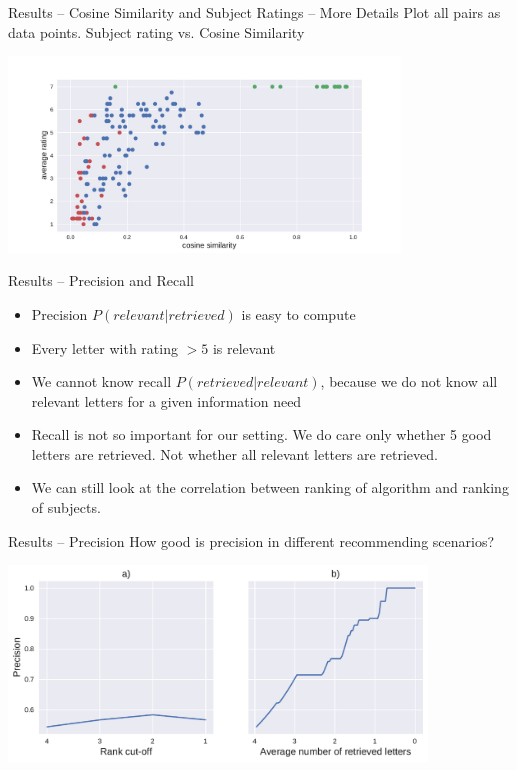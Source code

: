 \documentclass[10pt]{beamer}
\begin{document}
\begin{frame}{Results -- Cosine Similarity and Subject Ratings -- More Details}
	Plot all pairs as data points. Subject rating vs. Cosine Similarity
	\begin{center}
		\includegraphics[height=5.2cm]{rating_vs_similarity}
	\end{center}
\end{frame}


\begin{frame}{Results -- Precision and Recall}
	\begin{itemize}
		\item Precision $P(relevant|retrieved)$ is easy to compute
		\item Every letter with rating $>5$ is relevant
		\item We cannot know recall $P(retrieved|relevant)$, because we do not know all relevant letters for a given information need
		\item Recall is not so important for our setting. We do care only whether 5 good letters are retrieved. Not whether all relevant letters are retrieved.
		\item We can still look at the correlation between ranking of algorithm and ranking of subjects. 
	\end{itemize}
\end{frame}


\begin{frame}{Results -- Precision}
	How good is precision in different recommending scenarios?
	\begin{center}
		\includegraphics[height=5.2cm]{precision_rank_sim}
	\end{center}
\end{frame}
\end{document}
